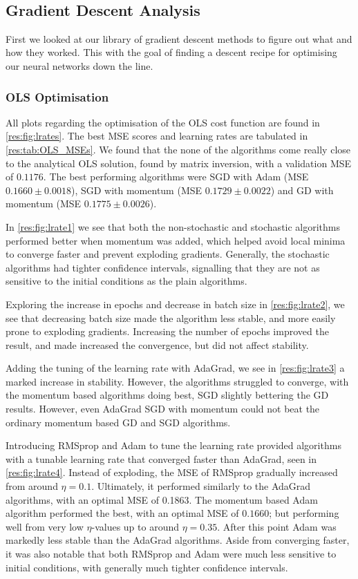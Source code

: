 \\

\subsection{Gradient Descent Analysis}
    First we looked at our library of gradient descent methods to figure out what and how they worked. This with the goal of finding a descent recipe for optimising our neural networks down the line.
    
    \subsubsection{OLS Optimisation}
        All plots regarding the optimisation of the OLS cost function are found in \cref{res:fig:lrates}. The best MSE scores and learning rates are tabulated in \cref{res:tab:OLS_MSEs}. We found that the none of the algorithms come really close to the analytical OLS solution, found by matrix inversion, with a validation MSE of $0.1176$. The best performing algorithms were SGD with Adam (MSE $0.1660 \pm 0.0018$), SGD with momentum (MSE $0.1729 \pm 0.0022$) and GD with momentum (MSE $0.1775 \pm 0.0026$).

        In \cref{res:fig:lrate1} we see that both the non-stochastic and stochastic algorithms performed better when momentum was added, which helped avoid local minima to converge faster and prevent exploding gradients. Generally, the stochastic algorithms had tighter confidence intervals, signalling that they are not as sensitive to the initial conditions as the plain algorithms.

        Exploring the increase in epochs and decrease in batch size in \cref{res:fig:lrate2}, we see that decreasing batch size made the algorithm less stable, and more easily prone to exploding gradients. Increasing the number of epochs improved the result, and made increased the convergence, but did not affect stability.

        Adding the tuning of the learning rate with AdaGrad, we see in \cref{res:fig:lrate3} a marked increase in stability. However, the algorithms struggled to converge, with the momentum based algorithms doing best, SGD slightly bettering the GD results. However, even AdaGrad SGD with momentum could not beat the ordinary momentum based GD and SGD algorithms.

        Introducing RMSprop and Adam to tune the learning rate provided algorithms with a tunable learning rate that converged faster than AdaGrad, seen in \cref{res:fig:lrate4}. Instead of exploding, the MSE of RMSprop gradually increased from around $\eta=0.1$. Ultimately, it performed similarly to the AdaGrad algorithms, with an optimal MSE of 0.1863. The momentum based Adam algorithm performed the best, with an optimal MSE of $0.1660$; but performing well from very low $\eta$-values up to around $\eta=0.35$. After this point Adam was markedly less stable than the AdaGrad algorithms. Aside from converging faster, it was also notable that both RMSprop and Adam were much less sensitive to initial conditions, with generally much tighter confidence intervals.

